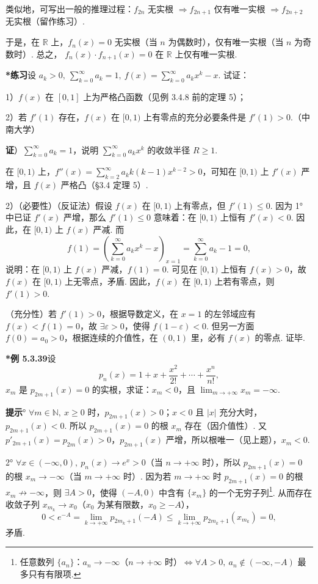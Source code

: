 \documentclass[UTF8,12pt,a4paper,fontset=fandol]{ctexart}
\begin{document}
类似地，可写出一般的推理过程：$f_{2n}$ 无实根 $\Rightarrow f_{2n+1}$ 仅有唯一实根
$\Rightarrow f_{2n+2}$ 无实根（留作练习）.

于是，在 $\mathbb R$ 上，$f_n(x)=0$ 无实根（当 $n$ 为偶数时），仅有唯一实根（当 $n$ 为奇数时）. 总之，
$f_n(x)\cdot f_{n+1}(x)=0$ 在 $\mathbb R$ 上仅有唯一实根.

\noindent\textbf{*练习}\quad 设 $a_k>0,\ \displaystyle\sum_{k=0}^{\infty}a_k=1,\ f(x)=\displaystyle\sum_{k=0}^{\infty}a_kx^k-x$. 试证：

1）$f(x)$ 在 $[0,1]$ 上为严格凸函数（见例 3.4.8 前的定理 5）；

2）若 $f'(1)$ 存在，$f(x)$ 在 $[0,1)$ 上有零点的充分必要条件是 $f'(1)>0$.（中南大学）

\noindent\textbf{证}）$\displaystyle\sum_{k=0}^{\infty}a_k=1$，说明 $\displaystyle\sum_{k=0}^{\infty}a_kx^k$ 的收敛半径 $R\ge1$.

在 $[0,1)$ 上，$f''(x)=\displaystyle\sum_{k=2}^{\infty}a_kk(k-1)x^{k-2}>0$，可知在 $[0,1)$ 上 $f'(x)$ 严增，且 $f(x)$ 严格凸（§3.4 定理 5）.

2）（必要性）（反证法）假设 $f(x)$ 在 $[0,1)$ 上有零点，但 $f'(1)\le0$. 因为 1° 中已证 $f'(x)$ 严增，那么 $f'(1)\le0$ 意味着：在 $[0,1)$ 上恒有 $f'(x)<0$. 因此，在 $[0,1)$ 上 $f(x)$ 严减. 而
\[
  f(1)=\left(\sum_{k=0}^{\infty}a_kx^k-x\right)_{x=1}
  =\sum_{k=0}^{\infty}a_k-1=0,
\]
说明：在 $[0,1)$ 上 $f(x)$ 严减，$f(1)=0$. 可见在 $[0,1)$ 上恒有 $f(x)>0$，故 $f(x)$ 在 $[0,1)$ 上无零点，矛盾. 因此，$f(x)$ 在 $[0,1)$ 上若有零点，则 $f'(1)>0$.

（充分性）若 $f'(1)>0$，根据导数定义，在 $x=1$ 的左邻域应有 $f(x)<f(1)=0$，故 $\exists\varepsilon>0$，使得 $f(1-\varepsilon)<0$. 但另一方面 $f(0)=a_0>0$，根据连续的介值性，在 $(0,1)$ 里，必有 $f(x)$ 的零点. 证毕.

\noindent\textbf{*例 5.3.39}\quad 设
\[
  p_n(x)=1+x+\frac{x^2}{2!}+\cdots+\frac{x^n}{n!},
\]
$x_m$ 是 $p_{2m+1}(x)=0$ 的实根，求证：$x_m<0$，且 $\displaystyle\lim_{m\to+\infty}x_m=-\infty$.

\noindent\textbf{提示}° $\forall m\in\mathbb N,\ x\ge0$ 时，$p_{2m+1}(x)>0$；$x<0$ 且 $|x|$ 充分大时，$p_{2m+1}(x)<0$. 所以 $p_{2m+1}(x)=0$ 的根 $x_m$ 存在（因介值性）. 又 $p'_{2m+1}(x)=p_{2m}(x)>0$，$p_{2m+1}(x)$ 严增，所以根唯一（见上题），$x_m<0$.

2° $\forall x\in(-\infty,0),\ p_n(x)\to e^x>0$（当 $n\to+\infty$ 时），所以 $p_{2m+1}(x)=0$ 的根 $x_m\to-\infty$（当 $m\to+\infty$ 时）. 因为若 $m\to+\infty$ 时 $p_{2m+1}(x)=0$ 的根 $x_m\not\to-\infty$，则 $\exists A>0$，使得 $(-A,0)$ 中含有 $\{x_m\}$ 的一个无穷子列\footnote{任意数列 $\{a_n\}$：$a_n\to-\infty$（$n\to+\infty$ 时）$\Leftrightarrow\forall A>0,\ a_n\notin(-\infty,-A)$ 最多只有有限项.}. 从而存在收敛子列 $x_{m_k}\to x_0$（$x_0$ 为某有限数，$x_0\ge-A$），
\[
  0<e^{-A}=\lim_{k\to+\infty}p_{2m_k+1}(-A)
  \le \lim_{k\to+\infty}p_{2m_k+1}(x_{m_k})=0,
\]
矛盾.
\end{document}
